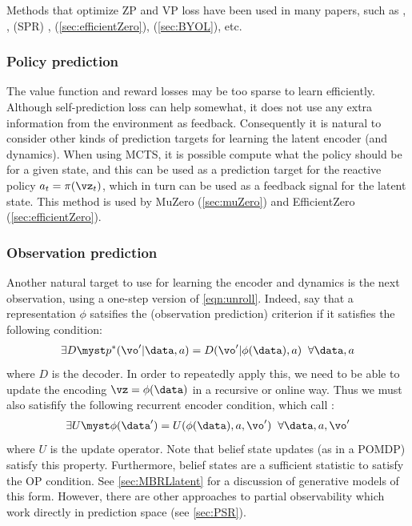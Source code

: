 Methods that optimize ZP and VP loss
have been used in many papers,
such as 
  \citep{predictron},
 \citep{Oh2017},
 (SPR)
\citep{Schwarzer2021},
(\cref{sec:efficientZero}),
(\cref{sec:BYOL}),
etc.


\subsubsection{Policy prediction}


The value function and reward losses may be too sparse
to learn efficiently. Although self-prediction loss can help somewhat,
it does not use any extra information from the environment as feedback.
Consequently it is natural to consider other kinds of prediction
targets for learning the latent encoder (and dynamics).
When using MCTS, it is possible compute what the policy should
be for a given state, and this can be used as a prediction
target for the reactive policy $a_t=\pi(\vz_t)$,
which in turn can be used as a feedback signal for the latent
state. This method is used by MuZero (\cref{sec:muZero})
and EfficientZero (\cref{sec:efficientZero}).



\subsubsection{Observation prediction}

Another natural target to use for learning the encoder
and dynamics is the next observation,
using a one-step version of \cref{eqn:unroll}.
Indeed, \citep{Ni2024} say that a representation $\phi$ satsifies
the  (observation prediction)
criterion if it satisfies the following condition:
\begin{align}
  \exists D \myst  p^*(\vo'|\hist,a) = D(\vo'|\phi(\hist),a)
\;\; \forall \hist,a
\end{align}
where $D$ is the decoder.
In order to repeatedly apply this, we need to be able
to update the encoding $\vz=\phi(\hist)$ in a recursive
or online way. Thus we must also satisfify
the following recurrent encoder condition,
which \citep{Ni2024}
call :
\begin{align}
  \exists U \myst  \phi(\hist') = U(\phi(\hist), a, \vo')
\;\; \forall \hist,a,\vo'
\end{align}
where $U$ is the update operator.
Note that belief state updates (as in a POMDP)
satisfy this property.
Furthermore, belief states are a sufficient statistic
to satisfy the OP condition.
See \cref{sec:MBRLlatent} for a discussion of generative models
of this form.
However, there are other approaches to partial
observability which work directly
in prediction space (see \cref{sec:PSR}).

